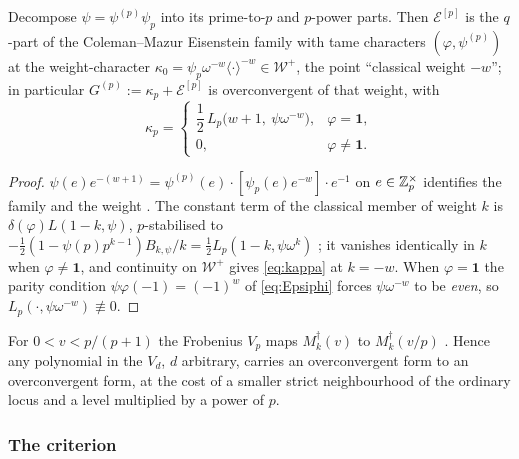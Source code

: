 \begin{lemma}\label{lem:avatargen}
\Lit{} Decompose $\psi=\psi^{(p)}\psi_p$ into its prime-to-$p$ and $p$-power
parts.  Then $\mathcal E^{[p]}$ is the $q$-part of the Coleman--Mazur Eisenstein
family with tame characters $(\varphi,\psi^{(p)})$ at the weight-character
$\kappa_0=\psi_p\omega^{-w}\langle\cdot\rangle^{-w}\in\mathcal W^+$, the point
``classical weight $-w$''; in particular $G^{(p)}:=\kappa_p+\mathcal E^{[p]}$ is
overconvergent of that weight, with
\begin{equation}\label{eq:kappa}
\kappa_p=\begin{cases}\dfrac12\,L_p\bigl(w+1,\ \psi\omega^{-w}\bigr), & \varphi=\mathbf 1,\\[6pt]
0, & \varphi\neq\mathbf 1 .\end{cases}
\end{equation}
\end{lemma}
\begin{proof}
$\psi(e)e^{-(w+1)}=\psi^{(p)}(e)\cdot[\psi_p(e)e^{-w}]\cdot e^{-1}$ on
$e\in\mathbb{Z}_p^\times$ identifies the family and the weight
\cite{Coleman1997,ColemanMazur1998}.  The constant term of the classical
member of weight $k$ is $\delta(\varphi)L(1-k,\psi)$, $p$-stabilised to
$-\tfrac12(1-\psi(p)p^{k-1})B_{k,\psi}/k=\tfrac12L_p(1-k,\psi\omega^k)$
\cite[Thm.~5.11]{Washington1997}; it vanishes identically in $k$ when
$\varphi\neq\mathbf 1$, and continuity on $\mathcal W^+$ gives \eqref{eq:kappa}
at $k=-w$.  When $\varphi=\mathbf 1$ the parity condition
$\psi\varphi(-1)=(-1)^w$ of \eqref{eq:Epsiphi} forces $\psi\omega^{-w}$ to be
\emph{even}, so $L_p(\cdot,\psi\omega^{-w})\not\equiv0$.
\end{proof}

\begin{lemma}\label{lem:Vp}
\Lit{} For $0<v<p/(p+1)$ the Frobenius $V_p$ maps $M^\dagger_k(v)$ to
$M^\dagger_k(v/p)$ \cite{Coleman1996}.  Hence any polynomial in the $V_d$,
$d$ arbitrary, carries an overconvergent form to an overconvergent form,
at the cost of a smaller strict neighbourhood of the ordinary locus and a
level multiplied by a power of $p$.
\end{lemma}

\subsubsection*{The criterion}

